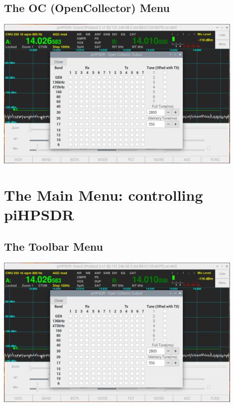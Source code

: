 \documentclass[12pt]{book}
\begin{document}
\section{The OC (OpenCollector) Menu}
\begin{center}
\includegraphics[width=12cm]{OCMenu.png}
\end{center}

\chapter{The Main Menu: controlling piHPSDR}

\section{The Toolbar Menu}
\begin{center}
\includegraphics[width=12cm]{OCMenu.png}
\end{center}
\end{document}
